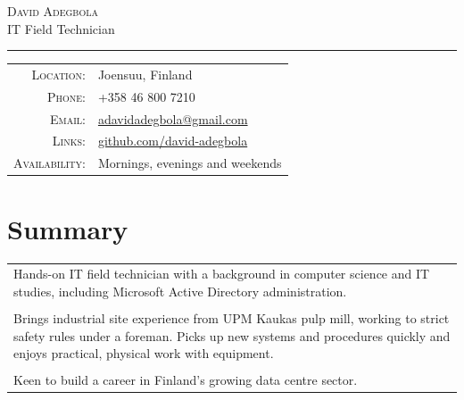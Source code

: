 \documentclass[a4paper,11pt]{article}
\begin{document}
\par{\centering
		{\Huge \textsc{David Adegbola}}\\[0.4em]
		{\Large IT Field Technician}
	\bigskip\par}

\hrule
\vspace{0.5em}
\begin{tabular}{rl}
  \textsc{Location:}  & Joensuu, Finland\\
  \textsc{Phone:}     & +358 46 800 7210\\
  \textsc{Email:}     & \href{mailto:adavidadegbola@gmail.com}{adavidadegbola@gmail.com}\\
  \textsc{Links:}     & \faGithub{} \href{https://github.com/david-adegbola}{github.com/david-adegbola}\\
  \textsc{Availability:} & Mornings, evenings and weekends\\
\end{tabular}

\section{Summary}
\begin{tabular}{p{}}
 Hands-on IT field technician with a background in computer science and IT studies, including Microsoft Active Directory administration.\\\\

 Brings industrial site experience from UPM Kaukas pulp mill, working to strict safety rules under a foreman. Picks up new systems and procedures quickly and enjoys practical, physical work with equipment.\\\\

 Keen to build a career in Finland's growing data centre sector.
\end{tabular}

\renewcommand{\arraystretch}{1.12}
\end{document}

